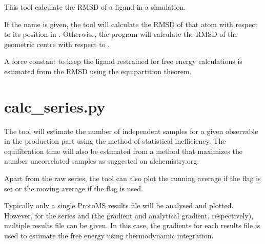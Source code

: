 \documentclass[letterpaper,10pt,english]{sphinxmanual}
\begin{document}
%
\begin{sphinxVerbatim}[commandchars=\\\{\}]
      
        
\end{sphinxVerbatim}


This tool calculate the RMSD of a ligand in a simulation.

If the  name is given, the tool will calculate the RMSD of that atom with respect to its position in . Otherwise, the program will calculate the RMSD of the geometric centre with respect to .

A force constant to keep the ligand restrained for free energy calculations is estimated from the RMSD using the equipartition theorem.


\section{calc\_series.py}
\label{\detokenize{tools:calc-series-py}}
The tool will estimate the number of independent samples for a given observable in the production part using the method of statistical inefficiency. The equilibration time will also be estimated from a method that maximizes the number uncorrelated samples as suggested on alchemistry.org.

Apart from the raw series, the tool can also plot the running average if the  flag is set or the moving average if the  flag is used.

Typically only a single ProtoMS results file will be analysed and plotted. However, for the series  and  (the gradient and analytical gradient, respectively), multiple results file can be given. In this case, the gradients for each results file is used to estimate the free energy using thermodynamic integration.
\end{document}

